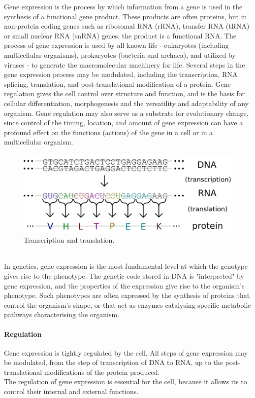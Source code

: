 \documentclass[a4paper]{report}
\begin{document}
Gene expression is the process by which information from a gene is used in the synthesis of a functional gene product. These products are often proteins, but in non-protein coding genes such as ribosomal RNA (rRNA), transfer RNA (tRNA) or small nuclear RNA (snRNA) genes, the product is a functional RNA. The process of gene expression is used by all known life - eukaryotes (including multicellular organisms), prokaryotes (bacteria and archaea), and utilized by viruses - to generate the macromolecular machinery for life. Several steps in the gene expression process may be modulated, including the transcription, RNA splicing, translation, and post-translational modification of a protein. Gene regulation gives the cell control over structure and function, and is the basis for cellular differentiation, morphogenesis and the versatility and adaptability of any organism. Gene regulation may also serve as a substrate for evolutionary change, since control of the timing, location, and amount of gene expression can have a profound effect on the functions (actions) of the gene in a cell or in a multicellular organism.
\\
\begin{figure}[htb] 
\begin{center}
\includegraphics[scale=0.27]{figure/geneticCode.png} 
\end{center}
\caption{Transcription and translation.}
\label{geneExpression}
\end{figure}
\\
In genetics, gene expression is the most fundamental level at which the genotype gives rise to the phenotype. The genetic code stored in DNA is "interpreted" by gene expression, and the properties of the expression give rise to the organism's phenotype. Such phenotypes are often expressed by the synthesis of proteins that control the organism's shape, or that act as enzymes catalysing specific metabolic pathways characterising the organism.

\paragraph{Regulation}
Gene expression is tightly regulated by the cell. All steps of gene expression may be modulated, from the step of transcription of DNA to RNA, up to the post-translational modifications of the protein produced.\\
The regulation of gene expression is essential for the cell, because it allows its to control their internal and external functions.
\end{document}
